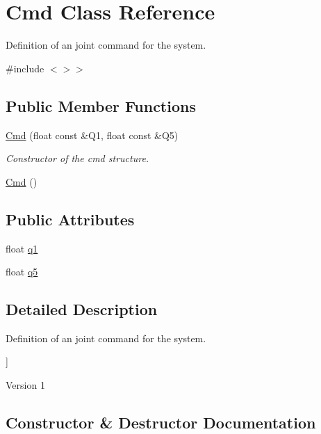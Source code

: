 \hypertarget{struct_cmd}{}\section{Cmd Class Reference}
\label{struct_cmd}


Definition of an joint command for the system.  




{\ttfamily \#include $<$$>$$>$}

\subsection*{Public Member Functions}
\begin{DoxyCompactItemize}
\item 
\mbox{\hyperlink{struct_cmd_af8e0a25a8ee2ff863bdb123466956b7f}{Cmd}} (float const \&Q1, float const \&Q5)
\begin{DoxyCompactList}\small\item\em Constructor of the cmd structure. \end{DoxyCompactList}\item 
\mbox{\hyperlink{struct_cmd_a6fe24cc9190b80a810e30bf8699f7572}{Cmd}} ()
\end{DoxyCompactItemize}
\subsection*{Public Attributes}
\begin{DoxyCompactItemize}
\item 
float \mbox{\hyperlink{struct_cmd_a56fa13e2f2554474e2261a4b2a449945}{q1}}
\item 
float \mbox{\hyperlink{struct_cmd_a8ed212db1c504cfbddc52c52322438db}{q5}}
\end{DoxyCompactItemize}


\subsection{Detailed Description}
Definition of an joint command for the system. 

\mbox{]} \begin{DoxyVersion}{Version}
1 
\end{DoxyVersion}


\subsection{Constructor \& Destructor Documentation}
\mbox{\label{struct_cmd_af8e0a25a8ee2ff863bdb123466956b7f}} 
